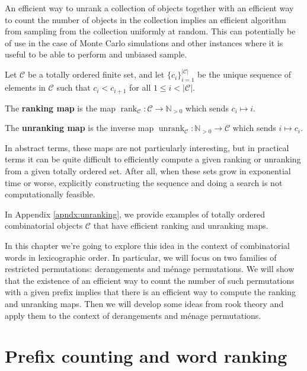 An efficient way to unrank a collection of objects together with an efficient
way to count the number of objects in the collection implies an efficient
algorithm from sampling from the collection uniformly at random. This can
potentially be of use in the case of Monte Carlo simulations and other
instances where it is useful to be able to perform and unbiased sample.

\begin{definition}
  Let $\mathcal C$ be a totally ordered finite set, and
  let $\{c_i\}_{i=1}^{|\mathcal C|}$ be the unique sequence of elements in
  $\mathcal{C}$ such that $c_i < c_{i+1}$ for all $1 \leq i < |\mathcal{C}|$.

  The \textbf{ranking map} is the map
  $\operatorname{rank}_{\mathcal{C}} \colon \mathcal{C} \rightarrow \mathbb N_{>0}$
  which sends $c_i \mapsto i$.

  The \textbf{unranking map} is the inverse map
  $\operatorname{unrank}_{\mathcal{C}} \colon \mathbb N_{>0} \rightarrow \mathcal{C}$
  which sends $i \mapsto c_i$.
\end{definition}

In abstract terms, these maps are not particularly interesting, but in practical
terms it can be quite difficult to efficiently compute a given ranking or
unranking from a given totally ordered set. After all, when these sets
grow in exponential time or worse, explicitly constructing the sequence and
doing a search is not computationally feasible.

In Appendix \ref{apndx:unranking}, we provide examples of totally ordered
combinatorial objects $\mathcal{C}$ that have efficient ranking and unranking
maps.

In this chapter we're going to explore this idea in the context of combinatorial
words in lexicographic order. In particular, we will focus on two families of
restricted permutations: derangements and m\'enage permutations. We will show
that the existence of an efficient way to count the number of such permutations
with a given prefix implies that there is an efficient way to compute the
ranking and unranking maps. Then we will develop some ideas from rook theory
and apply them to the context of derangements and m\'enage permutations.
\section{Prefix counting and word ranking}

